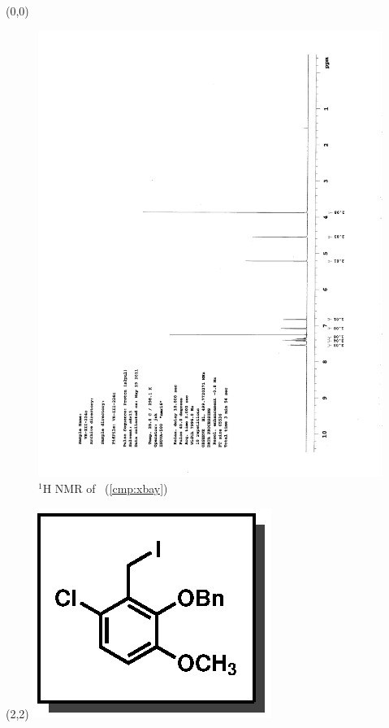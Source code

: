 \begin{textblock}{20}(0,0)
\begin{figure}[htb]
\caption{$^1$H NMR of \CMPxbay\ (\ref{cmp:xbay})}
\includegraphics[scale=0.75, trim = 0mm 0mm 0mm 5mm,
clip]{chp_singlecarbon/images/nmr/xbayH}
\vspace{-100pt}
\end{figure}
\end{textblock}
\begin{textblock}{1}(2,2)
\includegraphics[scale=0.8, angle=90]{chp_singlecarbon/images/xbay}
\end{textblock}
